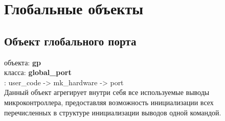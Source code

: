 \documentclass[a4paper, 12pt]{article}
\begin{document}
\section{Глобальные объекты}

\subsection{Объект глобального порта}
 объекта: \textbf{gp}\\
 класса: \textbf{global\_port}\\
: user\_code -> mk\_hardware -> port\\

Данный объект агрегирует внутри себя все используемые выводы микроконтроллера, предоставляя возможность инициализации всех перечисленных в структуре инициализации выводов одной командой.
\end{document}
